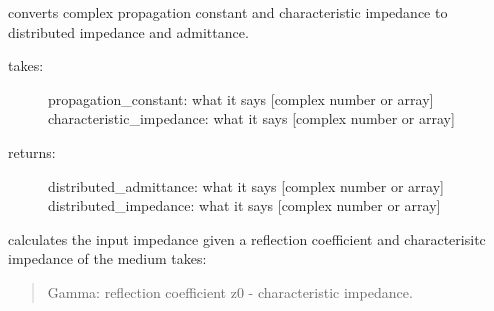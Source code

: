 \documentclass[letterpaper,10pt,english]{sphinxmanual}
\begin{document}

\begin{fulllineitems}
\label{api/mwavepy:mwavepy.tlineFunctions.propagation_impedance_2_distributed_circuit}
converts complex propagation constant and characteristic impedance 
to distributed impedance and admittance.
\begin{description}
\item[{takes:}] \leavevmode
propagation\_constant: what it says {[}complex number or array{]}
characteristic\_impedance: what it says {[}complex number or array{]}

\item[{returns:}] \leavevmode
distributed\_admittance: what it says {[}complex number or array{]}
distributed\_impedance: what it says {[}complex number or array{]}

\end{description}

\end{fulllineitems}


\begin{fulllineitems}
\label{api/mwavepy:mwavepy.tlineFunctions.reflection_coefficient_2_input_impedance}
calculates the input impedance given a reflection coefficient and 
characterisitc impedance of the medium
takes:
\begin{quote}

Gamma: reflection coefficient
z0 - characteristic impedance.
\end{quote}

\end{fulllineitems}

\end{document}
